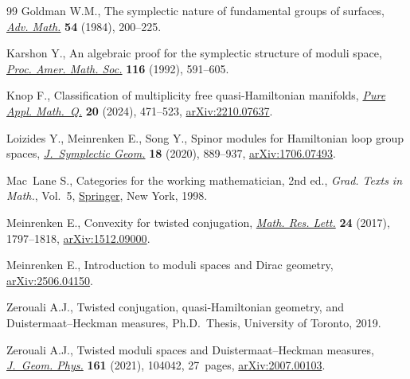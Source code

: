 \begin{thebibliography}{99}
Goldman W.M., The symplectic nature of fundamental groups of surfaces,
 \href{https://doi.org/10.1016/0001-8708(84)90040-9}{\textit{Adv. Math.}}
 \textbf{54} (1984), 200--225.

Karshon Y., An algebraic proof for the symplectic structure of moduli space,
 \href{https://doi.org/10.2307/2159424}{\textit{Proc. Amer. Math. Soc.}}
 \textbf{116} (1992), 591--605.

Knop F., Classification of multiplicity free quasi-{H}amiltonian manifolds,
 \href{https://doi.org/10.4310/pamq.2024.v20.n1.a10}{\textit{Pure Appl.
 Math.~Q.}} \textbf{20} (2024), 471--523,
 \href{https://arxiv.org/abs/2210.07637}{arXiv:2210.07637}.

Loizides Y., Meinrenken E., Song Y., Spinor modules for {H}amiltonian loop
 group spaces,
 \href{https://doi.org/10.4310/JSG.2020.v18.n3.a10}{\textit{J.~Symplectic
 Geom.}} \textbf{18} (2020), 889--937,
 \href{https://arxiv.org/abs/1706.07493}{arXiv:1706.07493}.

Mac~Lane S., Categories for the working mathematician, 2nd ed., \textit{Grad. Texts in
 Math.}, Vol.~5,
 \href{https://doi.org/10.1007/978-1-4757-4721-8}{Springer}, New York, 1998.


Meinrenken E., Convexity for twisted conjugation,
 \href{https://doi.org/10.4310/MRL.2017.v24.n6.a12}{\textit{Math. Res. Lett.}}
 \textbf{24} (2017), 1797--1818,
 \href{https://arxiv.org/abs/1512.09000}{arXiv:1512.09000}.

Meinrenken E., Introduction to moduli spaces and {D}irac geometry,
 \href{https://arxiv.org/abs/2506.04150}{arXiv:2506.04150}.

Zerouali A.J., Twisted conjugation, quasi-{H}amiltonian geometry, and
 {D}uistermaat--{H}eckman measures, Ph.D.~Thesis, {U}niversity of Toronto,
 2019.

Zerouali A.J., Twisted moduli spaces and {D}uistermaat--{H}eckman measures,
 \href{https://doi.org/10.1016/j.geomphys.2020.104042}{\textit{J.~Geom.
 Phys.}} \textbf{161} (2021), 104042, 27~pages,
 \href{https://arxiv.org/abs/2007.00103}{arXiv:2007.00103}.

\end{thebibliography} 
